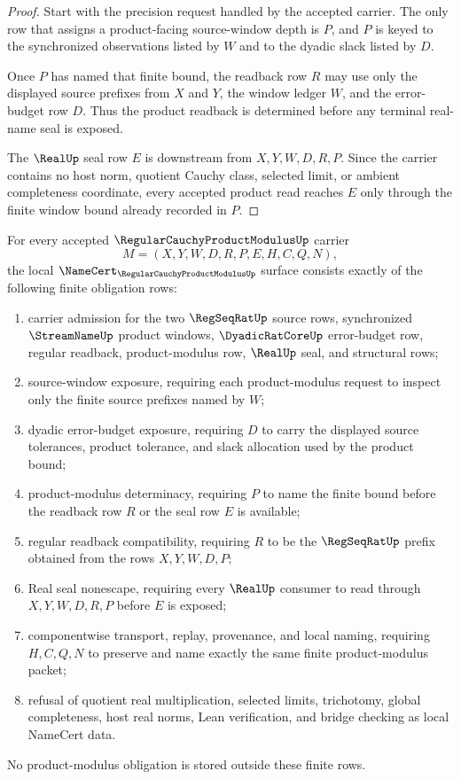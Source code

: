 \begin{proof}
Start with the precision request handled by the accepted carrier. The only row that assigns a product-facing source-window depth is $P$, and $P$ is keyed to the synchronized observations listed by $W$ and to the dyadic slack listed by $D$.

Once $P$ has named that finite bound, the readback row $R$ may use only the displayed source prefixes from $X$ and $Y$, the window ledger $W$, and the error-budget row $D$. Thus the product readback is determined before any terminal real-name seal is exposed.

The $\RealUp$ seal row $E$ is downstream from $X,Y,W,D,R,P$. Since the carrier contains no host norm, quotient Cauchy class, selected limit, or ambient completeness coordinate, every accepted product read reaches $E$ only through the finite window bound already recorded in $P$.
\end{proof}

\begin{theorem}
\label{thm:regular-cauchy-product-modulus-namecert-obligations}
For every accepted $\RegularCauchyProductModulusUp$ carrier
$$
M=(X,Y,W,D,R,P,E,H,C,Q,N),
$$
the local $\NameCert_{\RegularCauchyProductModulusUp}$ surface consists exactly of the following finite obligation rows:
\begin{enumerate}
\item carrier admission for the two $\RegSeqRatUp$ source rows, synchronized $\StreamNameUp$ product windows, $\DyadicRatCoreUp$ error-budget row, regular readback, product-modulus row, $\RealUp$ seal, and structural rows;
\item source-window exposure, requiring each product-modulus request to inspect only the finite source prefixes named by $W$;
\item dyadic error-budget exposure, requiring $D$ to carry the displayed source tolerances, product tolerance, and slack allocation used by the product bound;
\item product-modulus determinacy, requiring $P$ to name the finite bound before the readback row $R$ or the seal row $E$ is available;
\item regular readback compatibility, requiring $R$ to be the $\RegSeqRatUp$ prefix obtained from the rows $X,Y,W,D,P$;
\item Real seal nonescape, requiring every $\RealUp$ consumer to read through $X,Y,W,D,R,P$ before $E$ is exposed;
\item componentwise transport, replay, provenance, and local naming, requiring $H,C,Q,N$ to preserve and name exactly the same finite product-modulus packet;
\item refusal of quotient real multiplication, selected limits, trichotomy, global completeness, host real norms, Lean verification, and bridge checking as local NameCert data.
\end{enumerate}
No product-modulus obligation is stored outside these finite rows.
\end{theorem}

